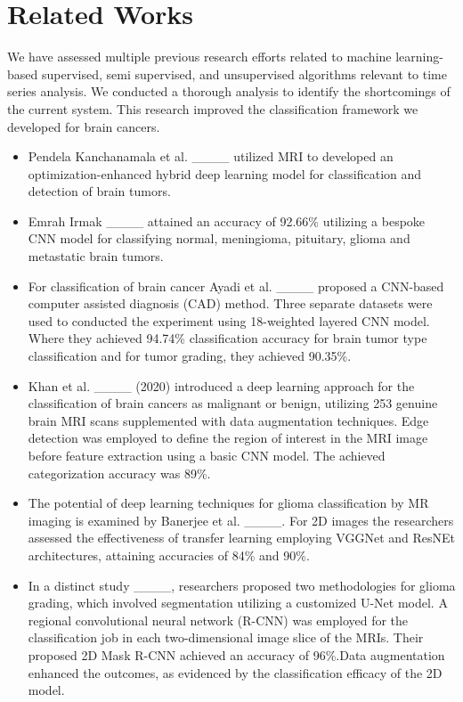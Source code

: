 \section{Related Works}
We have assessed multiple previous research efforts related to machine learning-based supervised, semi supervised, and unsupervised algorithms relevant to time series analysis. We conducted a thorough analysis to identify the shortcomings of the current system. This research improved the classification framework we developed for brain cancers.
\begin{itemize}
\item Pendela Kanchanamala et al. ____ utilized MRI to developed an optimization-enhanced hybrid deep learning model for classification and detection of brain tumors.

\item Emrah Irmak ____ attained an accuracy of 92.66\% utilizing a bespoke CNN model for classifying normal, meningioma, pituitary, glioma and metastatic brain tumors.

\item For classification of brain cancer Ayadi et al. ____ proposed a CNN-based computer assisted diagnosis (CAD) method. Three separate datasets were used to conducted the experiment using 18-weighted layered CNN model. Where they achieved 94.74\% classification accuracy for brain tumor type classification and for tumor grading, they achieved 90.35\%. 

\item Khan et al. ____ (2020) introduced a deep learning approach for the classification of brain cancers as malignant or benign, utilizing 253 genuine brain MRI scans supplemented with data augmentation techniques. Edge detection was employed to define the region of interest in the MRI image before feature extraction using a basic CNN model. The achieved categorization accuracy was 89\%.

\item The potential of deep learning techniques for glioma classification by MR imaging is examined by Banerjee et al. ____. For 2D images the researchers assessed the effectiveness of transfer learning employing VGGNet and ResNEt architectures, attaining accuracies of 84\% and 90\%. 

\item In a distinct study ____, researchers proposed two methodologies for glioma grading, which involved segmentation utilizing a customized U-Net model. A regional convolutional neural network (R-CNN) was employed for the classification job in each two-dimensional image slice of the MRIs. Their proposed 2D Mask R-CNN achieved an accuracy of 96\%.Data augmentation enhanced the outcomes, as evidenced by the classification efficacy of the 2D model.


\end{itemize}
